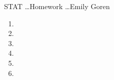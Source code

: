 \documentclass[12pt]{article}
\begin{document}
\noindent
{\Large STAT \dots \hfill Homework \dots \hfill Emily Goren}

\begin{enumerate}

\item
\bigskip

\item

\bigskip

\item

\bigskip

\item

\bigskip

\item

\bigskip

\item

\bigskip

\end{enumerate}
\end{document}
